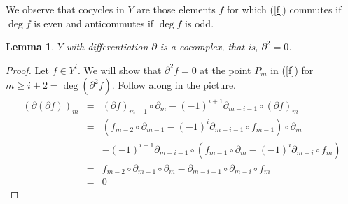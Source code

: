 \documentclass[12pt]{article}
\newtheorem{lemma}[definition]{Lemma}
\begin{document}
We observe that cocycles in $Y$ are those
elements $f$ for which (\ref{f}) commutes if $\deg f$ is even
and anticommutes if $\deg f$ is odd.

\begin{lemma}
$Y$ with differentiation
$\partial$ is a cocomplex, that is, $\partial^2=0$. 
\end{lemma}

\begin{proof}
Let $f\in Y^i$.  We will show that $\partial^2 f=0$ at the point $P_m$
in (\ref{f}) for $m\ge i+2=\deg\left(\partial^2 f\right)$. 
Follow along in the picture.
\begin{eqnarray*}
\left(\partial\left(\partial f\right)\right)_m
&=&\left(\partial f\right)_{m-1}\circ\partial_m
-\left(-1\right)^{i+1}
\partial_{m-i-1}\circ
\left(\partial f\right)_m\\
&=&\left(f_{m-2}\circ\partial_{m-1}
-\left(-1\right)^i\partial_{m-i-1}\circ f_{m-1} \right)
\circ\partial_m\\
&&-\left(-1\right)^{i+1}
\partial_{m-i-1}\circ
\left(f_{m-1}\circ\partial_m
-\left(-1\right)^i\partial_{m-i}\circ f_m\right)\\
&=&f_{m-2}\circ\partial_{m-1}\circ\partial_m
-\partial_{m-i-1}\circ\partial_{m-i}\circ f_m\\
&=&0
\end{eqnarray*}
\end{proof}
\end{document}
